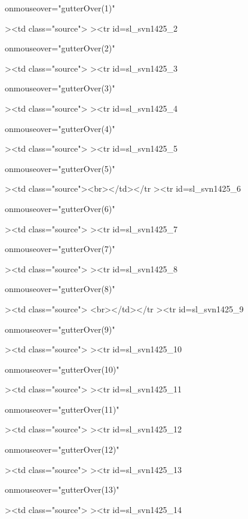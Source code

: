  onmouseover="gutterOver(1)"

><td class="source">%
><tr
id=sl_svn1425_2

 onmouseover="gutterOver(2)"

><td class="source">%
><tr
id=sl_svn1425_3

 onmouseover="gutterOver(3)"

><td class="source">%
><tr
id=sl_svn1425_4

 onmouseover="gutterOver(4)"

><td class="source">%
><tr
id=sl_svn1425_5

 onmouseover="gutterOver(5)"

><td class="source"><br></td></tr
><tr
id=sl_svn1425_6

 onmouseover="gutterOver(6)"

><td class="source">%
><tr
id=sl_svn1425_7

 onmouseover="gutterOver(7)"

><td class="source">%
><tr
id=sl_svn1425_8

 onmouseover="gutterOver(8)"

><td class="source"> <br></td></tr
><tr
id=sl_svn1425_9

 onmouseover="gutterOver(9)"

><td class="source">%
><tr
id=sl_svn1425_10

 onmouseover="gutterOver(10)"

><td class="source">%
><tr
id=sl_svn1425_11

 onmouseover="gutterOver(11)"

><td class="source">%
><tr
id=sl_svn1425_12

 onmouseover="gutterOver(12)"

><td class="source">%
><tr
id=sl_svn1425_13

 onmouseover="gutterOver(13)"

><td class="source">%
><tr
id=sl_svn1425_14

